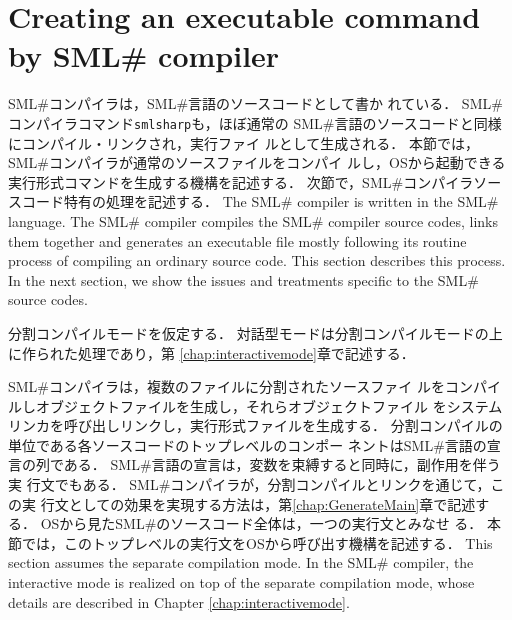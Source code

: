 \documentclass{jbook}
\newcommand{\txt}[2]{#2}
\newcommand{\smlsharp}{SML\#}
\newcommand{\code}[1]{\mbox{\large\tt #1}}
\begin{document}
\section{\txt{\smlsharp{}コンパイラによる実行形式プログラムの生成}{Creating an
executable command by \smlsharp{} compiler}}
\label{sec:SimpleMain.generateExec}

\ifjp%
	\smlsharp{}コンパイラは，\smlsharp{}言語のソースコードとして書か
れている．
	\smlsharp{}コンパイラコマンド\code{smlsharp}も，ほぼ通常の
\smlsharp{}言語のソースコードと同様にコンパイル・リンクされ，実行ファイ
ルとして生成される．
	本節では，\smlsharp{}コンパイラが通常のソースファイルをコンパイ
ルし，OSから起動できる実行形式コマンドを生成する機構を記述する．
	次節で，\smlsharp{}コンパイラソースコード特有の処理を記述する．
\else%
	The \smlsharp{} compiler is written in the \smlsharp{} language.
	The \smlsharp{} compiler compiles the \smlsharp{} compiler
source codes, links them together and generates an executable file
mostly following its routine process of compiling an ordinary source
code.
	This section describes this process.
	In the next section, we show the issues and treatments specific
to the \smlsharp{} source codes.
\fi%

\ifjp%
	分割コンパイルモードを仮定する．
	対話型モードは分割コンパイルモードの上に作られた処理であり，第
\ref{chap:interactivemode}章で記述する．

	\smlsharp{}コンパイラは，複数のファイルに分割されたソースファイ
ルをコンパイルしオブジェクトファイルを生成し，それらオブジェクトファイル
をシステムリンカを呼び出しリンクし，実行形式ファイルを生成する．
	分割コンパイルの単位である各ソースコードのトップレベルのコンポー
ネントは\smlsharp{}言語の宣言の列である．
	\smlsharp{}言語の宣言は，変数を束縛すると同時に，副作用を伴う実
行文でもある．
	\smlsharp{}コンパイラが，分割コンパイルとリンクを通じて，この実
行文としての効果を実現する方法は，第\ref{chap:GenerateMain}章で記述する．
	OSから見た\smlsharp{}のソースコード全体は，一つの実行文とみなせ
る．
	本節では，このトップレベルの実行文をOSから呼び出す機構を記述する．
\else%
	This section assumes the separate compilation mode.
	In the \smlsharp{} compiler, the interactive mode is realized
on top of the separate compilation mode, whose details are described in
Chapter \ref{chap:interactivemode}.
\end{document}

